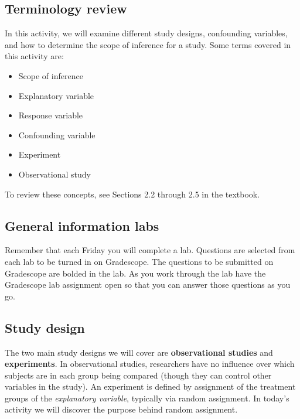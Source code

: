 \documentclass[
]{report}
\begin{document}
\hypertarget{terminology-review-3}{%
\subsection{Terminology review}\label{terminology-review-3}}

In this activity, we will examine different study designs, confounding variables, and how to determine the scope of inference for a study. Some terms covered in this activity are:

\begin{itemize}
\item
  Scope of inference
\item
  Explanatory variable
\item
  Response variable
\item
  Confounding variable
\item
  Experiment
\item
  Observational study
\end{itemize}

To review these concepts, see Sections 2.2 through 2.5 in the textbook.

\hypertarget{general-information-labs}{%
\subsection{General information labs}\label{general-information-labs}}

Remember that each Friday you will complete a lab. Questions are selected from each lab to be turned in on Gradescope. The questions to be submitted on Gradescope are bolded in the lab. As you work through the lab have the Gradescope lab assignment open so that you can answer those questions as you go.

\hypertarget{study-design-1}{%
\subsection*{Study design}\label{study-design-1}}

The two main study designs we will cover are \textbf{observational studies} and \textbf{experiments}. In observational studies, researchers have no influence over which subjects are in each group being compared (though they can control other variables in the study). An experiment is defined by assignment of the treatment groups of the \emph{explanatory variable}, typically via random assignment. In today's activity we will discover the purpose behind random assignment.
\end{document}
